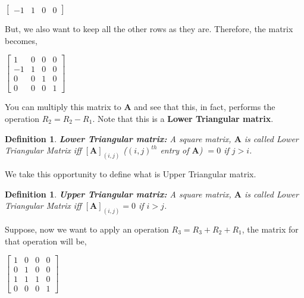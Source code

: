 \documentclass[a4paper]{article}
\newtheorem{definition}[theorem]{Definition}
\begin{document}
            \begin{center}
                $
                \begin{bmatrix}
                    -1 & 1 & 0 & 0 
                \end{bmatrix}
                $
            \end{center}
            
            But, we also want to keep all the other rows as they are. Therefore, the matrix becomes,
            
            \begin{center}
                $
                    \begin{bmatrix}
                    1  & 0 & 0 & 0 \\
                    -1 & 1 & 0 & 0 \\
                    0  & 0 & 1 & 0 \\
                    0  & 0 & 0 & 1 
                    \end{bmatrix}
                $
            \end{center}
            
            You can multiply this matrix to $\mathbf{A}$ and see that this, in fact, performs the operation $R_2 = R_2 - R_1$. Note that this is a \textbf{Lower Triangular matrix}.
            \begin{definition}
                \textbf{Lower Triangular matrix: } A square matrix, $\mathbf{A}$ is called Lower Triangular Matrix iff $[\mathbf{A}]_{(i,j)}$ ($(i,j)^{th}$ entry of $\mathbf{A}$) $ = 0$ if $j>i$. 
            \end{definition}
            
            We take this opportunity to define what is Upper Triangular matrix.
            \begin{definition}
                \textbf{Upper Triangular matrix: } A square matrix, $\mathbf{A}$ is called Lower Triangular Matrix iff $[\mathbf{A}]_{(i,j)} = 0$ if $i>j$. 
            \end{definition}
            
            \newpage
            
            Suppose, now we want to apply an operation $R_3 = R_3 + R_2 + R_1$, the matrix for that operation will be,
            
            \begin{center}
                $
                    \begin{bmatrix}
                    1  & 0 & 0 & 0 \\
                    0  & 1 & 0 & 0 \\
                    1  & 1 & 1 & 0 \\
                    0  & 0 & 0 & 1 
                    \end{bmatrix}
                $
            \end{center}
            
\end{document}
